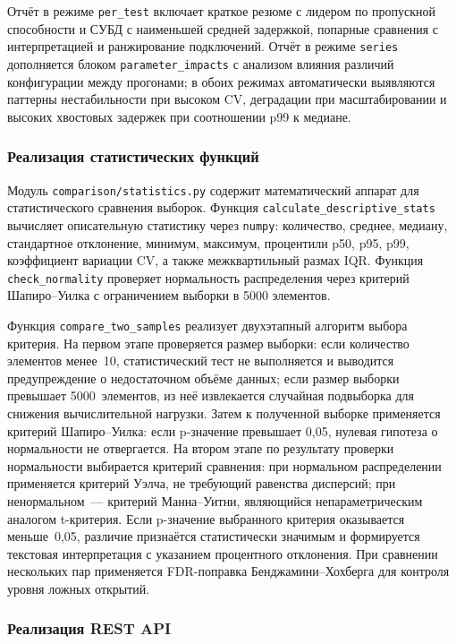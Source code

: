 Отчёт в режиме \texttt{per\_test} включает краткое резюме с лидером по пропускной способности и СУБД с наименьшей средней задержкой, попарные сравнения с интерпретацией и ранжирование подключений. Отчёт в режиме \texttt{series} дополняется блоком \texttt{parameter\_impacts} с анализом влияния различий конфигурации между прогонами; в обоих режимах автоматически выявляются паттерны нестабильности при высоком CV, деградации при масштабировании и высоких хвостовых задержек при соотношении p99 к медиане.

\subsubsection{Реализация статистических функций}

Модуль \texttt{comparison/statistics.py} содержит математический аппарат для статистического сравнения выборок. Функция \texttt{calculate\_descriptive\_stats} вычисляет описательную статистику через \texttt{numpy}: количество, среднее, медиану, стандартное отклонение, минимум, максимум, процентили p50, p95, p99, коэффициент вариации CV, а также межквартильный размах IQR. Функция \texttt{check\_normality} проверяет нормальность распределения через критерий Шапиро--Уилка с ограничением выборки в 5000 элементов.

Функция \texttt{compare\_two\_samples} реализует двухэтапный алгоритм выбора критерия. На первом этапе проверяется размер выборки: если количество элементов менее~10, статистический тест не выполняется и выводится предупреждение о недостаточном объёме данных; если размер выборки превышает 5000~элементов, из неё извлекается случайная подвыборка для снижения вычислительной нагрузки. Затем к полученной выборке применяется критерий Шапиро--Уилка: если p-значение превышает 0,05, нулевая гипотеза о нормальности не отвергается. На втором этапе по результату проверки нормальности выбирается критерий сравнения: при нормальном распределении применяется критерий Уэлча, не требующий равенства дисперсий; при ненормальном~--- критерий Манна--Уитни, являющийся непараметрическим аналогом t-критерия. Если p-значение выбранного критерия оказывается меньше~0,05, различие признаётся статистически значимым и формируется текстовая интерпретация с указанием процентного отклонения. При сравнении нескольких пар применяется FDR-поправка Бенджамини--Хохберга для контроля уровня ложных открытий.

\subsubsection{Реализация REST API}


